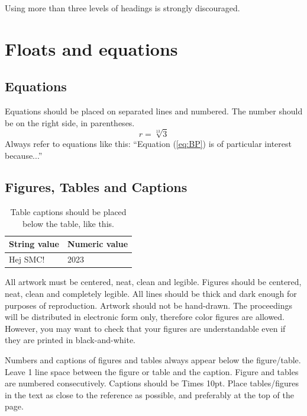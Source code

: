 \documentclass{article}
\begin{document}
Using more than three levels of headings is strongly discouraged.





\section{Floats and equations}

\subsection{Equations}
Equations should be placed on separated lines and numbered. The number should be on the right side, in parentheses.
\begin{equation}
r=\sqrt[13]{3}
\label{eq:BP}
\end{equation}
Always refer to equations like this: ``Equation (\ref{eq:BP}) is of particular interest because...''

\subsection{Figures, Tables and Captions}
\begin{table}[t]
 \begin{center}
 \begin{tabular}{|l|l|}
  \hline
  String value & Numeric value \\
  \hline
  Hej SMC! & 2023 \\
  \hline
 \end{tabular}
\end{center}
 \caption{Table captions should be placed below the table,  like this.}
 \label{tab:example}
\end{table}

All artwork must be centered, neat, clean and legible. Figures should be centered, neat, clean
and completely legible. All lines should be thick and dark enough for purposes of reproduction. Artwork should not be hand-drawn. The proceedings will be distributed in electronic form only, therefore color figures are allowed. However, you may want to check that your figures are understandable even if they are printed in black-and-white.


Numbers and captions of figures and tables always appear below the figure/table.
Leave 1 line space between the figure or table and the caption.
Figure and tables are numbered consecutively. 
Captions should be Times 10pt. Place tables/figures in the text as close to the reference as possible, 
and preferably at the top of the page.
\end{document}
